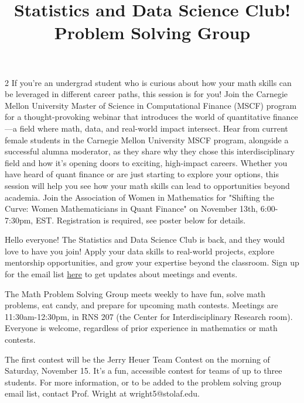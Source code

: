 \documentclass[12pt]{article}
\newcommand{\bolder}{\textbf}
\begin{document}
\begin{multicols}{2}
If you’re an undergrad student who is curious about how your math skills can be leveraged in different career paths, this session is for you! Join the Carnegie Mellon University Master of Science in Computational Finance (MSCF) program for a thought-provoking webinar that introduces the world of quantitative finance—a field where math, data, and real-world impact intersect. Hear from current female students in the Carnegie Mellon University MSCF program, alongside a successful alumna moderator, as they share why they chose this interdisciplinary field and how it’s opening doors to exciting, high-impact careers. Whether you have heard of quant finance or are just starting to explore your options, this session will help you see how your math skills can lead to opportunities beyond academia. Join the Association of Women in Mathematics for "Shifting the Curve: Women Mathematicians in Quant Finance" on November 13th, 6:00-7:30pm, EST. Registration is required, see poster below for details.

\begin{tcolorbox}[colback=white, colframe=black]
    \begin{center}
    \title{{\large \bolder{Statistics and Data Science Club!
}}}
    \end{center}
\end{tcolorbox}

Hello everyone! The Statistics and Data Science Club is back, and they would love to have you join! Apply your data skills to real-world projects, explore mentorship opportunities, and grow your expertise beyond the classroom. Sign up for the email list \href{https://docs.google.com/forms/d/e/1FAIpQLSeV00ldRadWwtvfA8nmOIuL43iZ0MFHp6O5cmrPY5HAsxVJMQ/viewform}{here} to get updates about meetings and events. 



\begin{tcolorbox}[colback=white, colframe=black]
    \begin{center}
    \title{{\large \bolder{Problem Solving Group}}}
    \end{center}
\end{tcolorbox}
The Math Problem Solving Group meets weekly to have fun, solve math problems, eat candy, and prepare for upcoming math contests. Meetings are 11:30am-12:30pm, in RNS 207 (the Center for Interdisciplinary Research room). Everyone is welcome, regardless of prior experience in mathematics or math contests.

The first contest will be the Jerry Heuer Team Contest on the morning of Saturday, November 15. It's a fun, accessible contest for teams of up to three students. For more information, or to be added to the problem solving group email list, contact Prof. Wright at wright5@stolaf.edu.



\end{multicols}
\end{document}
